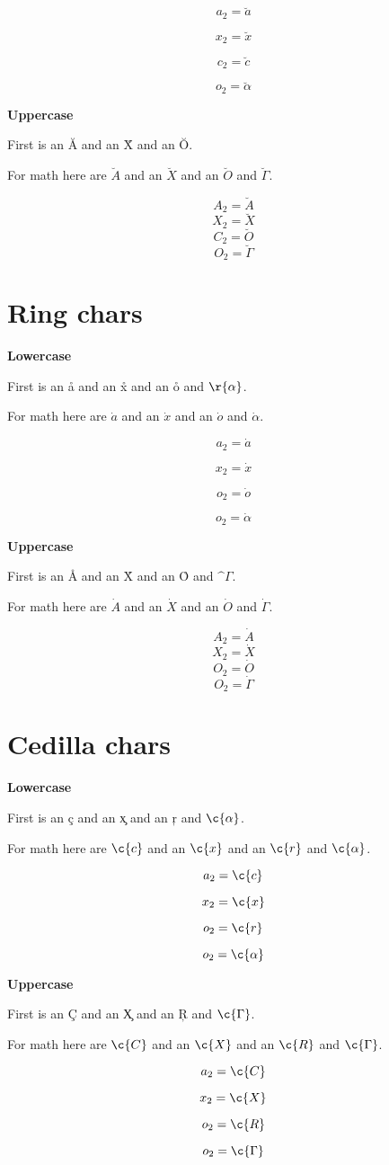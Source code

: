 \documentclass{article}
\begin{document}
$$a_2=\breve{a}$$

$$x_2=\breve{x}$$

$$c_2=\breve{c}$$

$$o_2=\breve{\alpha}$$

\textbf{Uppercase}

First is an \u{A} and an \u{X} and an \u{O}.

For math here are $\breve{A}$ and an $\breve{X}$ and an $\breve{O}$ and $\breve{\Gamma}$.

$$A_2=\breve{A}$$
$$X_2=\breve{X}$$
$$C_2=\breve{O}$$
$$O_2=\breve{\Gamma}$$

\section{Ring chars}
\textbf{Lowercase}

First is an \r{a} and an \r{x} and an \r{o} and $\r{\alpha}$.

For math here are $\dot{a}$ and an $\dot{x}$ and an $\dot{o}$ and $\dot{\alpha}$.

$$a_2=\dot{a}$$

$$x_2=\dot{x}$$

$$o_2=\dot{o}$$

$$o_2=\dot{\alpha}$$


\textbf{Uppercase}

First is an \r{A} and an \r{X} and an \r{O} and $\^{\Gamma}$.

For math here are $\dot{A}$ and an $\dot{X}$ and an $\dot{O}$ and $\dot{\Gamma}$.

$$A_2=\dot{A}$$
$$X_2=\dot{X}$$
$$O_2=\dot{O}$$
$$O_2=\dot{\Gamma}$$




\section{Cedilla chars}
\textbf{Lowercase}

First is an \c{c} and an \c{x} and an \c{r} and $\c{\alpha}$.

For math here are $\c{c}$ and an $\c{x}$ and an $\c{r}$ and $\c{\alpha}$.

$$a_2=\c{c}$$

$$x_2=\c{x}$$

$$o_2=\c{r}$$

$$o_2=\c{\alpha}$$


\textbf{Uppercase}

First is an \c{C} and an \c{X} and an \c{R} and $\c{\Gamma}$.

For math here are $\c{C}$ and an $\c{X}$ and an $\c{R}$ and $\c{\Gamma}$.

$$a_2=\c{C}$$

$$x_2=\c{X}$$

$$o_2=\c{R}$$

$$o_2=\c{\Gamma}$$


\end{document}
